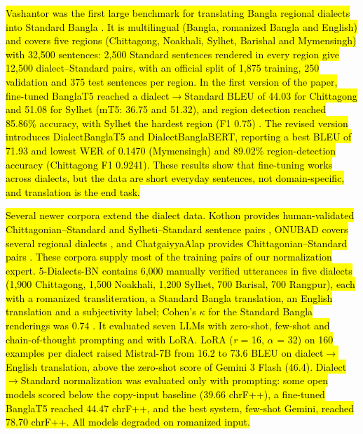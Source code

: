 \hl{Vashantor was the first large benchmark for translating Bangla
regional dialects into Standard Bangla \cite{faria2023vashantor}. It is multilingual
(Bangla, romanized Bangla and English) and covers five regions
(Chittagong, Noakhali, Sylhet, Barishal and Mymensingh) with 32,500
sentences: 2,500 Standard sentences rendered in every region give 12,500
dialect--Standard pairs, with an official split of 1,875 training, 250
validation and 375 test sentences per region. In the first version of
the paper, fine-tuned BanglaT5 reached a dialect\ensuremath{\rightarrow}Standard BLEU of 44.03
for Chittagong and 51.08 for Sylhet (mT5: 36.75 and 51.32), and region
detection reached 85.86\% accuracy, with Sylhet the hardest region (F1
0.75) \cite{faria2023vashantor}. The revised version introduces DialectBanglaT5 and
DialectBanglaBERT, reporting a best BLEU of 71.93 and lowest WER of
0.1470 (Mymensingh) and 89.02\% region-detection accuracy (Chittagong F1
0.9241). These results show that fine-tuning works across dialects, but
the data are short everyday sentences, not domain-specific, and
translation is the end task.}

\hl{Several newer corpora extend the dialect data. Kothon provides
human-validated Chittagonian--Standard and Sylheti--Standard sentence
pairs \cite{kothon2026}, ONUBAD covers several regional dialects \cite{sultana2025onubad}, and
ChatgaiyyaAlap provides Chittagonian--Standard pairs \cite{chatgaiyyaalap2025}. These
corpora supply most of the training pairs of our normalization expert.
5-Dialects-BN contains 6,000 manually verified utterances in five
dialects (1,900 Chittagong, 1,500 Noakhali, 1,200 Sylhet, 700 Barisal,
700 Rangpur), each with a romanized transliteration, a Standard Bangla
translation, an English translation and a subjectivity label; Cohen's \ensuremath{\kappa}
for the Standard Bangla renderings was 0.74 \cite{jawad2026fivedialects}. It evaluated seven
LLMs with zero-shot, few-shot and chain-of-thought prompting and with
LoRA. LoRA (\emph{r} = 16, \emph{\ensuremath{\alpha}} = 32) on 160 examples per dialect
raised Mistral-7B from 16.2 to 73.6 BLEU on dialect\ensuremath{\rightarrow}English translation,
above the zero-shot score of Gemini 3 Flash (46.4). Dialect\ensuremath{\rightarrow}Standard
normalization was evaluated only with prompting: some open models scored
below the copy-input baseline (39.66 chrF++), a fine-tuned BanglaT5
reached 44.47 chrF++, and the best system, few-shot Gemini, reached
78.70 chrF++. All models degraded on romanized input.}


